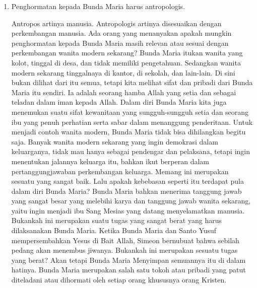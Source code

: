 \begin{enumerate}
\item Penghormatan kepada Bunda Maria harus antropologis.

Antropos artinya manusia. Antropologis artinya disesuaikan dengan perkembangan manusia. Ada orang yang menanyakan apakah mungkin penghormatan kepada Bunda Maria masih relevan atau sesuai dengan perkembangan wanita modern sekarang? Bunda Maria itukan wanita yang kolot, tinggal di desa, dan tidak memiliki pengetahuan. Sedangkan wanita modern sekarang tinggalnaya di kantor, di sekolah, dan lain-lain. Di sini bukan dilihat dari itu semua, tetapi kita melihat sifat dan pribadi dari Bunda Maria itu sendiri. Ia adalah seorang hamba Allah yang setia dan sebagai teladan dalam iman kepada Allah. Dalam diri Bunda Maria kita juga menemukan suatu sifat kewanitaan yang sungguh-sungguh setia dan seorang ibu yang penuh perhatian serta sabar dalam menanggung penderitaan. Untuk menjadi contoh wanita modern, Bunda Maria tidak bisa dihilangkan begitu saja. Banyak wanita modern sekarang yang ingin demokrasi dalam keluarganya, tidak mau hanya sebagai pendengar dan pelaksana, tetapi ingin menentukan jalannya keluarga itu, bahkan ikut berperan dalam pertanggungjawaban perkembangan keluarga. Memang ini merupakan sesuatu yang sangat baik. Lalu apakah kebebasan seperti itu terdapat pula dalam diri Bunda Maria? Bunda Maria bahkan menerima tanggung jawab yang sangat besar yang melebihi karya dan tanggung jawab wanita sekarang, yaitu ingin menjadi ibu Sang Mesias yang datang menyelamatkan manusia. Bukankah ini merupakan suatu tugas yang sangat berat yang harus dilaksanakan Bunda Maria. Ketika Bunda Maria dan Santo Yusuf mempersembahkan Yesus di Bait Allah, Simeon bernubuat bahwa sebilah pedang akan menembus jiwanya. Bukankah ini merupakan sesuatu tugas yang berat? Akan tetapi Bunda Maria Menyimpan semuannya itu di dalam hatinya. Bunda Maria merupakan salah satu tokoh atau pribadi yang patut diteladani atau dihormati oleh setiap orang khususnya orang Kristen.
\end{enumerate}

